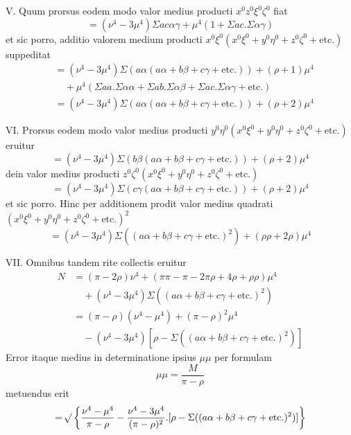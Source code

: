 V. Quum prorsus eodem modo valor medius producti \(x^0z^0\xi^0\zeta^0\) fiat
\[
=(\nu^4-3\mu^4)\Sigma ac\alpha\gamma+\mu^4(1+\Sigma ac.\Sigma\alpha\gamma)
\]
et sic porro, additio valorem medium producti \(x^0\xi^0(x^0\xi^0+y^0\eta^0+z^0\zeta^0+\text{etc.})\) suppeditat
\[
\begin{aligned}
&=(\nu^4-3\mu^4)\Sigma(a\alpha(a\alpha+b\beta+c\gamma+\text{etc.}))+(\rho+1)\mu^4\\
&\quad+\mu^4(\Sigma aa.\Sigma\alpha\alpha+\Sigma ab.\Sigma\alpha\beta+\Sigma ac.\Sigma\alpha\gamma+\text{etc.})\\
&=(\nu^4-3\mu^4)\Sigma(a\alpha(a\alpha+b\beta+c\gamma+\text{etc.}))+(\rho+2)\mu^4
\end{aligned}
\]

VI. Prorsus eodem modo valor medius producti \(y^0\eta^0(x^0\xi^0+y^0\eta^0+z^0\zeta^0+\text{etc.})\) eruitur
\[
=(\nu^4-3\mu^4)\Sigma(b\beta(a\alpha+b\beta+c\gamma+\text{etc.}))+(\rho+2)\mu^4
\]
dein valor medius producti \(z^0\zeta^0(x^0\xi^0+y^0\eta^0+z^0\zeta^0+\text{etc.})\)
\[
=(\nu^4-3\mu^4)\Sigma(c\gamma(a\alpha+b\beta+c\gamma+\text{etc.}))+(\rho+2)\mu^4
\]
et sic porro. Hinc per additionem prodit valor medius quadrati \((x^0\xi^0+y^0\eta^0+z^0\zeta^0+\text{etc.})^2\)
\[
=(\nu^4-3\mu^4)\Sigma((a\alpha+b\beta+c\gamma+\text{etc.})^2)+(\rho\rho+2\rho)\mu^4
\]

VII. Omnibus tandem rite collectis eruitur
\[
\begin{aligned}
N&=(\pi-2\rho)\nu^4+(\pi\pi-\pi-2\pi\rho+4\rho+\rho\rho)\mu^4\\
&\quad+(\nu^4-3\mu^4)\Sigma((a\alpha+b\beta+c\gamma+\text{etc.})^2)\\
&=(\pi-\rho)(\nu^4-\mu^4)+(\pi-\rho)^2\mu^4\\
&\quad-(\nu^4-3\mu^4)[\rho-\Sigma((a\alpha+b\beta+c\gamma+\text{etc.})^2)]
\end{aligned}
\]
Error itaque medius in determinatione ipsius \(\mu\mu\) per formulam
\[
\mu\mu=\frac{M}{\pi-\rho}
\]
metuendus erit
\[
=\mathord{{}^{}\!\surd}\left\{\frac{\nu^4-\mu^4}{\pi-\rho}-\frac{\nu^4-3\mu^4}{(\pi-\rho)^2}.[\rho-\Sigma((a\alpha+b\beta+c\gamma+\text{etc.})^2)]\right\}
\]

